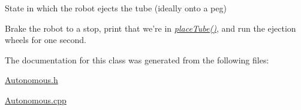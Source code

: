 State in which the robot ejects the tube (ideally onto a peg) 

Brake the robot to a stop, print that we're in {\itshape \hyperlink{class_r_j_f_r_c2011_1_1_autonomous_af0c3a743192b8ba41280999752a1e7da}{placeTube()}\/}, and run the ejection wheels for one second. 

The documentation for this class was generated from the following files:\begin{DoxyCompactItemize}
\item 
\hyperlink{_autonomous_8h}{Autonomous.h}\item 
\hyperlink{_autonomous_8cpp}{Autonomous.cpp}\end{DoxyCompactItemize}
